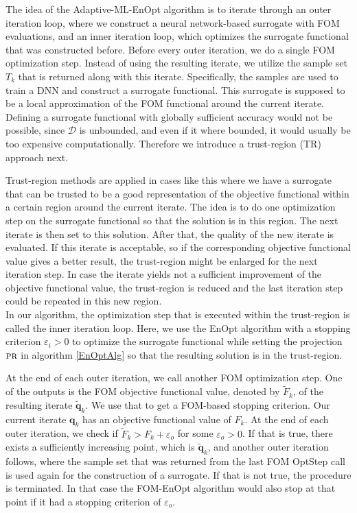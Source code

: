 The idea of the Adaptive-ML-EnOpt algorithm is to iterate through an outer iteration loop, where we construct a neural network-based surrogate with FOM evaluations, and an inner iteration loop, which optimizes the surrogate functional that was constructed before. Before every outer iteration, we do a single FOM optimization step. Instead of using the resulting iterate, we utilize the sample set $T_k$ that is returned along with this iterate. Specifically, the samples are used to train a DNN and construct a surrogate functional. This surrogate is supposed to be a local approximation of the FOM functional around the current iterate. Defining a surrogate functional with globally sufficient accuracy would not be possible, since $\mathcal{D}$ is unbounded, and even if it where bounded, it would usually be too expensive computationally. Therefore we introduce a trust-region (TR) approach \cite{Nocedal2006-hg} next.

Trust-region methods are applied in cases like this where we have a surrogate that can be trusted to be a good representation of the objective functional within a certain region around the current iterate. The idea is to do one optimization step on the surrogate functional so that the solution is in this region. The next iterate is then set to this solution. After that, the quality of the new iterate is evaluated. If this iterate is acceptable, so if the corresponding objective functional value gives a better result, the trust-region might be enlarged for the next iteration step. In case the iterate yields not a sufficient improvement of the objective functional value, the trust-region is reduced and the last iteration step could be repeated in this new region.\\

In our algorithm, the optimization step that is executed within the trust-region is called the inner iteration loop. Here, we use the EnOpt algorithm with a stopping criterion $\varepsilon_i>0$ to optimize the surrogate functional while setting the projection $\textproc{pr}$ in algorithm \ref{EnOptAlg} so that the resulting solution is in the trust-region.

At the end of each outer iteration, we call another FOM optimization step. One of the outputs is the FOM objective functional value, denoted by $\tilde{F}_k$, of the resulting iterate $\tilde{\mathbf{q}}_k$. We use that to get a FOM-based stopping criterion. Our current iterate $\mathbf{q}_k$ has an objective functional value of $F_k$. At the end of each outer iteration, we check if $\tilde{F}_k>F_k+\varepsilon_o$ for some $\varepsilon_o>0$. If that is true, there exists a sufficiently increasing point, which is $\tilde{\mathbf{q}}_k$, and another outer iteration follows, where the sample set that was returned from the last FOM OptStep call is used again for the construction of a surrogate. If that is not true, the procedure is terminated. In that case the FOM-EnOpt algorithm would also stop at that point if it had a stopping criterion of $\varepsilon_o$.\\

